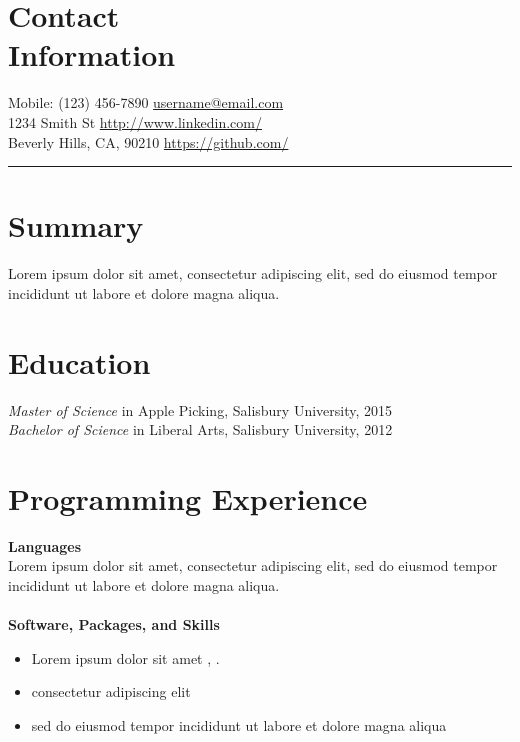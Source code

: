 \documentclass[line,mm]{res} %
\begin{document}
\begin{resume}

\section{\mysidestyle Contact\\Information}
    
Mobile: (123) 456-7890  \hfill      \href{mailto:username@email.com}{username@email.com} \\
1234 Smith St   \hfill    \href{http://www.linkedin.com/}{http://www.linkedin.com/}                                                                 \\
Beverly Hills, CA, 90210     \hfill      \href{https://github.com/}{https://github.com/} 
\rule{\textwidth}{0.2pt} 
\section{\mysidestyle Summary}
Lorem ipsum dolor sit amet, consectetur adipiscing elit, sed do eiusmod tempor incididunt ut labore et dolore magna aliqua.


\section{\mysidestyle Education}
    \textsl{Master of Science} in Apple Picking, Salisbury University, 2015 \\ %
    \textsl{Bachelor of Science} in Liberal Arts, Salisbury University, 2012 \vspace{-1mm}%


\section{\mysidestyle Programming Experience} 
\textbf{Languages} \\
Lorem ipsum dolor sit amet, consectetur adipiscing elit, sed do eiusmod tempor incididunt ut labore et dolore magna aliqua. \\ \\
\textbf{Software, Packages, and Skills} \\
\begin{itemize}
\item Lorem ipsum dolor sit amet , .
\item consectetur adipiscing elit
\item sed do eiusmod tempor incididunt ut labore et dolore magna aliqua
\end{itemize}


\end{resume}
\end{document}
